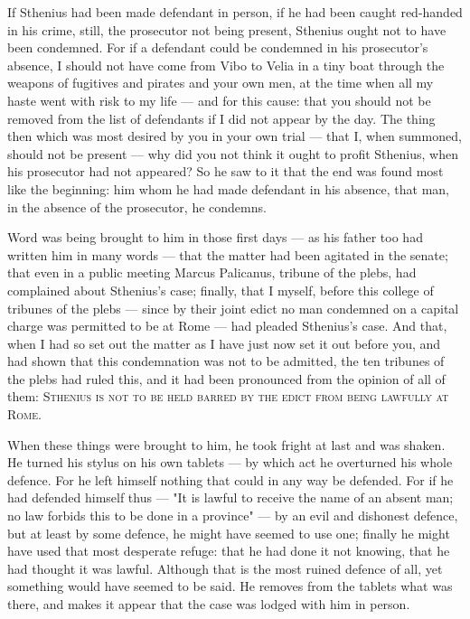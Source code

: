  If Sthenius had been made defendant in person, if he had been caught red-handed in his crime, still, the prosecutor not being present, Sthenius ought not to have been condemned. For if a defendant could be condemned in his prosecutor's absence, I should not have come from Vibo to Velia in a tiny boat through the weapons of fugitives and pirates and your own men, at the time when all my haste went with risk to my life --- and for this cause: that you should not be removed from the list of defendants if I did not appear by the day. The thing then which was most desired by you in your own trial --- that I, when summoned, should not be present --- why did you not think it ought to profit Sthenius, when his prosecutor had not appeared? So he saw to it that the end was found most like the beginning: him whom he had made defendant in his absence, that man, in the absence of the prosecutor, he condemns.

 Word was being brought to him in those first days --- as his father too had written him in many words --- that the matter had been agitated in the senate; that even in a public meeting Marcus Palicanus, tribune of the plebs, had complained about Sthenius's case; finally, that I myself, before this college of tribunes of the plebs --- since by their joint edict no man condemned on a capital charge was permitted to be at Rome --- had pleaded Sthenius's case. And that, when I had so set out the matter as I have just now set it out before you, and had shown that this condemnation was not to be admitted, the ten tribunes of the plebs had ruled this, and it had been pronounced from the opinion of all of them: \textsc{Sthenius is not to be held barred by the edict from being lawfully at Rome}.

 When these things were brought to him, he took fright at last and was shaken. He turned his stylus on his own tablets --- by which act he overturned his whole defence. For he left himself nothing that could in any way be defended. For if he had defended himself thus --- "It is lawful to receive the name of an absent man; no law forbids this to be done in a province" --- by an evil and dishonest defence, but at least by some defence, he might have seemed to use one; finally he might have used that most desperate refuge: that he had done it not knowing, that he had thought it was lawful. Although that is the most ruined defence of all, yet something would have seemed to be said. He removes from the tablets what was there, and makes it appear that the case was lodged with him in person.

